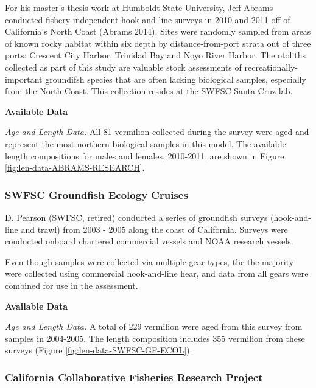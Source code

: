 \documentclass[
  english,
  a4paper,
]{article}
\begin{document}
For his master's thesis work at Humboldt State University, Jeff Abrams conducted fishery-independent
hook-and-line surveys in 2010 and 2011 off of California's North Coast (Abrams 2014). Sites were randomly sampled from
areas of known rocky habitat within six depth by distance-from-port strata out of three ports:
Crescent City Harbor, Trinidad Bay and Noyo River Harbor. The otoliths collected as part of this
study are valuable stock assessments of recreationally-important groundifsh species that are often lacking biological samples,
especially from the North Coast. This collection resides at the SWFSC Santa Cruz lab.

\textbf{Available Data}

\emph{Age and Length Data.}
All 81 vermilion collected during the survey were aged and represent the most northern biological
samples in this model. The available length compositions for males and females, 2010-2011, are shown in Figure
\ref{fig:len-data-ABRAMS-RESEARCH}.

\hypertarget{swfsc-groundfish-ecology-cruises}{%
\subsubsection{SWFSC Groundfish Ecology Cruises}\label{swfsc-groundfish-ecology-cruises}}

D. Pearson (SWFSC, retired) conducted a series of groundfish surveys (hook-and-line and
trawl) from 2003 - 2005 along the coast of California. Surveys were conducted onboard
chartered commercial vessels and NOAA research vessels.

Even though samples were collected via multiple gear types, the the majority were collected using commercial hook-and-line hear, and data from all gears were combined for use
in the assessment.

\textbf{Available Data}

\emph{Age and Length Data.}
A total of 229 vermilion were aged from this survey from samples in 2004-2005.
The length composition includes 355 vermilion from these surveys
(Figure \ref{fig:len-data-SWFSC-GF-ECOL}).

\hypertarget{california-collaborative-fisheries-research-project}{%
\subsubsection{California Collaborative Fisheries Research Project}\label{california-collaborative-fisheries-research-project}}
\end{document}
